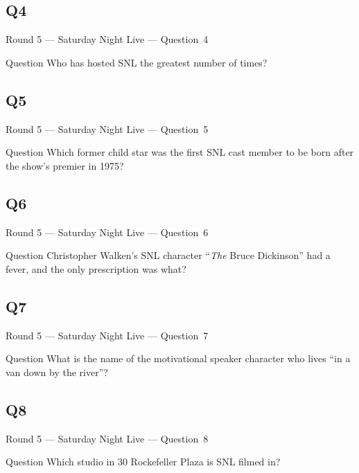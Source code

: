 \documentclass[11pt]{beamer}
\begin{document}
\subsection*{Q4}
\begin{frame}[t]{Round 5 --- Saturday Night Live --- \mbox{Question 4}}
\vspace{-0.5em}
\begin{block}{Question}
Who has hosted SNL the greatest number of times?
\end{block}
\end{frame}
\subsection*{Q5}
\begin{frame}[t]{Round 5 --- Saturday Night Live --- \mbox{Question 5}}
\vspace{-0.5em}
\begin{block}{Question}
Which former child star was the first SNL cast member to be born after the show's premier in 1975?
\end{block}
\end{frame}
\subsection*{Q6}
\begin{frame}[t]{Round 5 --- Saturday Night Live --- \mbox{Question 6}}
\vspace{-0.5em}
\begin{block}{Question}
Christopher Walken's SNL character ``\emph{The} Bruce Dickinson'' had a fever, and the only prescription was what?
\end{block}
\end{frame}
\subsection*{Q7}
\begin{frame}[t]{Round 5 --- Saturday Night Live --- \mbox{Question 7}}
\vspace{-0.5em}
\begin{block}{Question}
What is the name of the motivational speaker character who lives ``in a van down by the river''?
\end{block}
\end{frame}
\subsection*{Q8}
\begin{frame}[t]{Round 5 --- Saturday Night Live --- \mbox{Question 8}}
\vspace{-0.5em}
\begin{block}{Question}
Which studio in 30 Rockefeller Plaza is SNL filmed in?
\end{block}
\end{frame}
\end{document}
